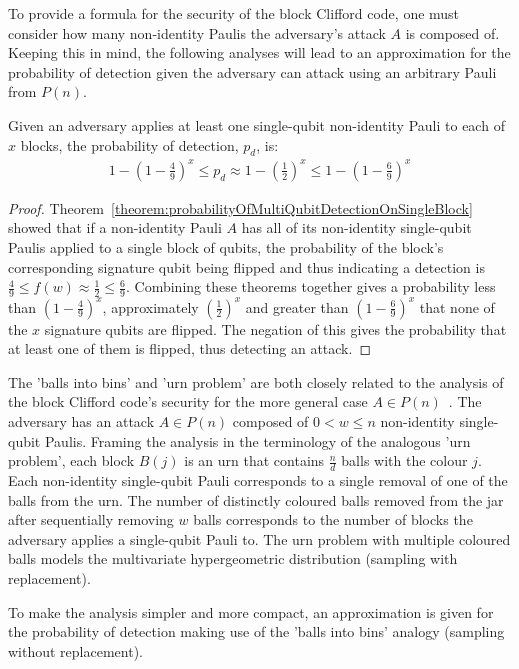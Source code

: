 To provide a formula for the security of the block Clifford code, one must consider how many non-identity Paulis the adversary's attack $A$ is composed of. Keeping this in mind, the following analyses will lead to an approximation for the probability of detection given the adversary can attack using an arbitrary Pauli from $P(n)$.
\begin{corollary}
\label{corollary:adversaryAttacksKblocks}
Given an adversary applies at least one single-qubit non-identity Pauli to each of $x$ blocks, the probability of detection, $p_d$, is:
\begin{align}
1 - (1-\frac{4}{9})^x \leq p_d \approx 1 - (\frac{1}{2})^x \leq 1 - (1-\frac{6}{9})^x
\end{align}
\end{corollary}
\begin{proof}
Theorem~\ref{theorem:probabilityOfMultiQubitDetectionOnSingleBlock} showed that if a non-identity Pauli $A$ has all of its non-identity single-qubit Paulis applied to a single block of qubits, the probability of the block's corresponding signature qubit being flipped and thus indicating a detection is $\frac{4}{9} \leq f(w) \approx \frac{1}{2} \leq \frac{6}{9}$. Combining these theorems together gives a probability less than $(1-\frac{4}{9})^{x}$, approximately $(\frac{1}{2})^{x}$  and greater than $(1-\frac{6}{9})^{x}$ that none of the $x$ signature qubits are flipped. The negation of this gives the probability that at least one of them is flipped, thus detecting an attack.
\end{proof}

The 'balls into bins' and 'urn problem' are both closely related to the analysis of the block Clifford code's security for the more general case $A \in P(n)$~\cite{BallsIntoBinsProblemWiki,UrnProblemWiki}. The adversary has an attack $A \in P(n)$ composed of $0 < w \leq n$ non-identity single-qubit Paulis. Framing the analysis in the terminology of the analogous 'urn problem', each block $B(j)$ is an urn that contains $\frac{n}{d}$ balls with the colour $j$. Each non-identity single-qubit Pauli corresponds to a single removal of one of the balls from the urn. The number of distinctly coloured balls removed from the jar after sequentially removing $w$ balls corresponds to the number of blocks the adversary applies a single-qubit Pauli to. The urn problem with multiple coloured balls models the multivariate hypergeometric distribution (sampling with replacement).

To make the analysis simpler and more compact, an approximation is given for the probability of detection making use of the 'balls into bins' analogy (sampling without replacement).

